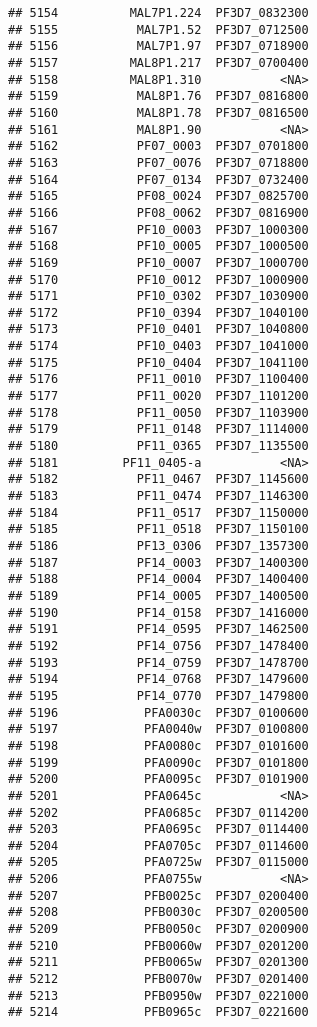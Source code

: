 \documentclass[12pt, a4paper]{article}\usepackage[]{graphicx}\usepackage[]{color}
\makeatletter
\newenvironment{kframe}{%
 \def\at@end@of@kframe{}%
 \ifinner\ifhmode%
  \def\at@end@of@kframe{\end{minipage}}%
  \begin{minipage}{\columnwidth}%
 \fi\fi%
 \def\FrameCommand##1{\hskip\@totalleftmargin \hskip-\fboxsep
 \colorbox{shadecolor}{##1}\hskip-\fboxsep
     \hskip-\linewidth \hskip-\@totalleftmargin \hskip\columnwidth}%
 \MakeFramed {\advance\hsize-\width
   \@totalleftmargin\z@ \linewidth\hsize
   \@setminipage}}%
 {\par\unskip\endMakeFramed%
 \at@end@of@kframe}
\newenvironment{knitrout}{}{} %
\makeatother
\begin{document}
\begin{knitrout}
\begin{kframe}
\begin{verbatim}
## 5154          MAL7P1.224  PF3D7_0832300
## 5155           MAL7P1.52  PF3D7_0712500
## 5156           MAL7P1.97  PF3D7_0718900
## 5157          MAL8P1.217  PF3D7_0700400
## 5158          MAL8P1.310           <NA>
## 5159           MAL8P1.76  PF3D7_0816800
## 5160           MAL8P1.78  PF3D7_0816500
## 5161           MAL8P1.90           <NA>
## 5162           PF07_0003  PF3D7_0701800
## 5163           PF07_0076  PF3D7_0718800
## 5164           PF07_0134  PF3D7_0732400
## 5165           PF08_0024  PF3D7_0825700
## 5166           PF08_0062  PF3D7_0816900
## 5167           PF10_0003  PF3D7_1000300
## 5168           PF10_0005  PF3D7_1000500
## 5169           PF10_0007  PF3D7_1000700
## 5170           PF10_0012  PF3D7_1000900
## 5171           PF10_0302  PF3D7_1030900
## 5172           PF10_0394  PF3D7_1040100
## 5173           PF10_0401  PF3D7_1040800
## 5174           PF10_0403  PF3D7_1041000
## 5175           PF10_0404  PF3D7_1041100
## 5176           PF11_0010  PF3D7_1100400
## 5177           PF11_0020  PF3D7_1101200
## 5178           PF11_0050  PF3D7_1103900
## 5179           PF11_0148  PF3D7_1114000
## 5180           PF11_0365  PF3D7_1135500
## 5181         PF11_0405-a           <NA>
## 5182           PF11_0467  PF3D7_1145600
## 5183           PF11_0474  PF3D7_1146300
## 5184           PF11_0517  PF3D7_1150000
## 5185           PF11_0518  PF3D7_1150100
## 5186           PF13_0306  PF3D7_1357300
## 5187           PF14_0003  PF3D7_1400300
## 5188           PF14_0004  PF3D7_1400400
## 5189           PF14_0005  PF3D7_1400500
## 5190           PF14_0158  PF3D7_1416000
## 5191           PF14_0595  PF3D7_1462500
## 5192           PF14_0756  PF3D7_1478400
## 5193           PF14_0759  PF3D7_1478700
## 5194           PF14_0768  PF3D7_1479600
## 5195           PF14_0770  PF3D7_1479800
## 5196            PFA0030c  PF3D7_0100600
## 5197            PFA0040w  PF3D7_0100800
## 5198            PFA0080c  PF3D7_0101600
## 5199            PFA0090c  PF3D7_0101800
## 5200            PFA0095c  PF3D7_0101900
## 5201            PFA0645c           <NA>
## 5202            PFA0685c  PF3D7_0114200
## 5203            PFA0695c  PF3D7_0114400
## 5204            PFA0705c  PF3D7_0114600
## 5205            PFA0725w  PF3D7_0115000
## 5206            PFA0755w           <NA>
## 5207            PFB0025c  PF3D7_0200400
## 5208            PFB0030c  PF3D7_0200500
## 5209            PFB0050c  PF3D7_0200900
## 5210            PFB0060w  PF3D7_0201200
## 5211            PFB0065w  PF3D7_0201300
## 5212            PFB0070w  PF3D7_0201400
## 5213            PFB0950w  PF3D7_0221000
## 5214            PFB0965c  PF3D7_0221600

\end{verbatim}
\end{kframe}
\end{knitrout}
\end{document}

